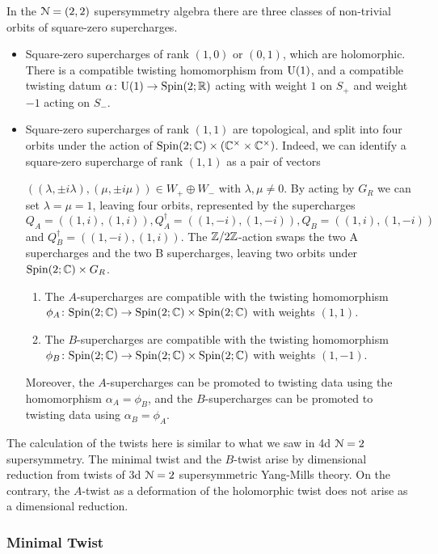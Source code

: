 \documentclass[10pt, oneside]{article}
\begin{document}
In the $\mathcal{N}=(2,2)$ supersymmetry algebra there are three classes of non-trivial orbits of square-zero supercharges.  
\begin{itemize}
 \item Square-zero supercharges of rank $(1,0)$ or $(0,1)$, which are holomorphic.  
There is a compatible twisting homomorphism from $\mathrm{U}(1)$, and a compatible twisting datum $\alpha \colon \mathrm{U}(1) \to \mathrm{Spin}(2;\mathbb R)$ acting with weight $1$ on $S_+$ and weight $-1$ acting on $S_-$.  
 \item Square-zero supercharges of rank $(1,1)$ are topological, and split into four orbits under the action of $\mathrm{Spin}(2;\mathbb C) \times (\mathbb C^\times \times \mathbb C^\times)$.  Indeed, we can identify a square-zero supercharge of rank $(1,1)$ as a pair of vectors~
 
\noindent$((\lambda, \pm i \lambda), (\mu, \pm i \mu)) \in W_+ \oplus W_-$ with $\lambda, \mu \ne 0$.  By acting by $G_R$ we can set $\lambda = \mu = 1$, leaving four orbits, represented by the supercharges $Q_A = ((1,i),(1,i)), Q_A^\dagger = ((1,-i),(1,-i)), Q_B = ((1,i),(1,-i))$ and $Q_B^\dagger = ((1,-i),(1,i))$.  The $\mathbb Z/2\mathbb Z$-action swaps the two A supercharges and the two B supercharges, leaving two orbits under $\mathrm{Spin}(2;\mathbb C) \times G_R$.  
\begin{enumerate}
\item The $A$-supercharges are compatible with the twisting homomorphism $\phi_{A} \colon \mathrm{Spin}(2;\mathbb C) \to \mathrm{Spin}(2;\mathbb C) \times \mathrm{Spin}(2;\mathbb C)$ with weights $(1,1)$.
\item The $B$-supercharges are compatible with the twisting homomorphism $\phi_{B} \colon \mathrm{Spin}(2;\mathbb C) \to \mathrm{Spin}(2;\mathbb C) \times \mathrm{Spin}(2;\mathbb C)$ with weights $(1,-1)$.  
\end{enumerate}
Moreover, the $A$-supercharges can be promoted to twisting data using the homomorphism $\alpha_A = \phi_B$, and the $B$-supercharges can be promoted to twisting data using $\alpha_B = \phi_A$.
\end{itemize}

The calculation of the twists here is similar to what we saw in 4d $\mathcal{N}=2$ supersymmetry.  
The minimal twist and the $B$-twist arise by dimensional reduction from twists of 3d $\mathcal N=2$ supersymmetric Yang-Mills theory.
On the contrary, the $A$-twist as a deformation of the holomorphic twist does not arise as a dimensional reduction. 

\subsubsection{Minimal Twist} \label{sect:2d22minimaltwist}
\end{document}
